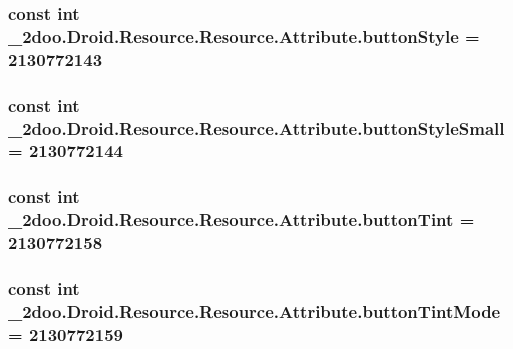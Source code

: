 \hypertarget{class__2doo_1_1_droid_1_1_resource_1_1_attribute_b154acce8ffadabe60805bea89ef683a}{
\subsubsection[{buttonStyle}]{\setlength{\rightskip}{0pt plus 5cm}const int \_\-2doo.Droid.Resource.Resource.Attribute.buttonStyle = 2130772143}}
\label{class__2doo_1_1_droid_1_1_resource_1_1_attribute_b154acce8ffadabe60805bea89ef683a}


\hypertarget{class__2doo_1_1_droid_1_1_resource_1_1_attribute_38cdd655ab958ef51148910f5f1b0d91}{
\subsubsection[{buttonStyleSmall}]{\setlength{\rightskip}{0pt plus 5cm}const int \_\-2doo.Droid.Resource.Resource.Attribute.buttonStyleSmall = 2130772144}}
\label{class__2doo_1_1_droid_1_1_resource_1_1_attribute_38cdd655ab958ef51148910f5f1b0d91}


\hypertarget{class__2doo_1_1_droid_1_1_resource_1_1_attribute_303a04c14effa3b8b1dfe92dee81492c}{
\subsubsection[{buttonTint}]{\setlength{\rightskip}{0pt plus 5cm}const int \_\-2doo.Droid.Resource.Resource.Attribute.buttonTint = 2130772158}}
\label{class__2doo_1_1_droid_1_1_resource_1_1_attribute_303a04c14effa3b8b1dfe92dee81492c}


\hypertarget{class__2doo_1_1_droid_1_1_resource_1_1_attribute_5ecddddeb4fbfcbdee7651d1eca6b74f}{
\subsubsection[{buttonTintMode}]{\setlength{\rightskip}{0pt plus 5cm}const int \_\-2doo.Droid.Resource.Resource.Attribute.buttonTintMode = 2130772159}}
\label{class__2doo_1_1_droid_1_1_resource_1_1_attribute_5ecddddeb4fbfcbdee7651d1eca6b74f}


